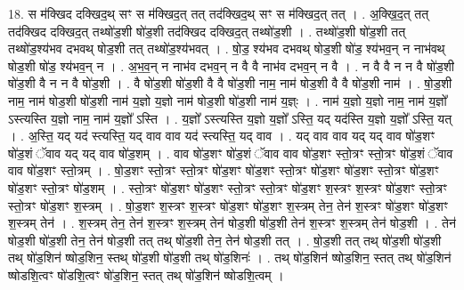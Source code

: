 \documentclass[17pt]{extarticle}
\begin{document}
18. स म॑क्खिद दक्खिद॒थ् सꣳ स म॑क्खिद॒त् तत् तद॑क्खिद॒थ् सꣳ स म॑क्खिद॒त् तत् । . अ॒क्खि॒द॒त् तत् तद॑क्खिद दक्खिद॒त् तथ्षो॑ड॒शी षो॑ड॒शी तद॑क्खिद दक्खिद॒त् तथ्षो॑ड॒शी । . तथ्षो॑ड॒शी षो॑ड॒शी तत् तथ्षो॑ड॒श्य॑भव दभवथ् षोड॒शी तत् तथ्षो॑ड॒श्य॑भवत् । . षो॒ड॒ श्य॑भव दभवथ् षोड॒शी षो॑ड॒ श्य॑भव॒न् न नाभ॑वथ् षोड॒शी षो॑ड॒ श्य॑भव॒न् न । . अ॒भ॒व॒न् न नाभ॑व दभव॒न् न वै वै नाभ॑व दभव॒न् न वै । . न वै वै न न वै षो॑ड॒शी षो॑ड॒शी वै न न वै षो॑ड॒शी । . वै षो॑ड॒शी षो॑ड॒शी वै वै षो॑ड॒शी नाम॒ नाम॑ षोड॒शी वै वै षो॑ड॒शी नाम॑ । . षो॒ड॒शी नाम॒ नाम॑ षोड॒शी षो॑ड॒शी नाम॑ य॒ज्ञो य॒ज्ञो नाम॑ षोड॒शी षो॑ड॒शी नाम॑ य॒ज्ञ्ः । . नाम॑ य॒ज्ञो य॒ज्ञो नाम॒ नाम॑ य॒ज्ञो᳚ ऽस्त्यस्ति य॒ज्ञो नाम॒ नाम॑ य॒ज्ञो᳚ ऽस्ति । . य॒ज्ञो᳚ ऽस्त्यस्ति य॒ज्ञो य॒ज्ञो᳚ ऽस्ति॒ यद् यद॑स्ति य॒ज्ञो य॒ज्ञो᳚ ऽस्ति॒ यत् । . अ॒स्ति॒ यद् यद॑ स्त्यस्ति॒ यद् वाव वाव यद॑ स्त्यस्ति॒ यद् वाव । . यद् वाव वाव यद् यद् वाव षो॑ड॒शꣳ षो॑ड॒शं ॅवाव यद् यद् वाव षो॑ड॒शम् । . वाव षो॑ड॒शꣳ षो॑ड॒शं ॅवाव वाव षो॑ड॒शꣳ स्तो॒त्रꣳ स्तो॒त्रꣳ षो॑ड॒शं ॅवाव वाव षो॑ड॒शꣳ स्तो॒त्रम् । . षो॒ड॒शꣳ स्तो॒त्रꣳ स्तो॒त्रꣳ षो॑ड॒शꣳ षो॑ड॒शꣳ स्तो॒त्रꣳ षो॑ड॒शꣳ षो॑ड॒शꣳ स्तो॒त्रꣳ षो॑ड॒शꣳ षो॑ड॒शꣳ स्तो॒त्रꣳ षो॑ड॒शम् । . स्तो॒त्रꣳ षो॑ड॒शꣳ षो॑ड॒शꣳ स्तो॒त्रꣳ स्तो॒त्रꣳ षो॑ड॒शꣳ श॒स्त्रꣳ श॒स्त्रꣳ षो॑ड॒शꣳ स्तो॒त्रꣳ स्तो॒त्रꣳ षो॑ड॒शꣳ श॒स्त्रम् । . षो॒ड॒शꣳ श॒स्त्रꣳ श॒स्त्रꣳ षो॑ड॒शꣳ षो॑ड॒शꣳ श॒स्त्रम् तेन॒ तेन॑ श॒स्त्रꣳ षो॑ड॒शꣳ षो॑ड॒शꣳ श॒स्त्रम् तेन॑ । . श॒स्त्रम् तेन॒ तेन॑ श॒स्त्रꣳ श॒स्त्रम् तेन॑ षोड॒शी षो॑ड॒शी तेन॑ श॒स्त्रꣳ श॒स्त्रम् तेन॑ षोड॒शी । . तेन॑ षोड॒शी षो॑ड॒शी तेन॒ तेन॑ षोड॒शी तत् तथ् षो॑ड॒शी तेन॒ तेन॑ षोड॒शी तत् । . षो॒ड॒शी तत् तथ् षो॑ड॒शी षो॑ड॒शी तथ् षो॑ड॒शिन॑ ष्षोड॒शिन॒ स्तथ् षो॑ड॒शी षो॑ड॒शी तथ् षो॑ड॒शिनः॑ । . तथ् षो॑ड॒शिन॑ ष्षोड॒शिन॒ स्तत् तथ् षो॑ड॒शिन॑ ष्षोडशि॒त्वꣳ षो॑डशि॒त्वꣳ षो॑ड॒शिन॒ स्तत् तथ् षो॑ड॒शिन॑ ष्षोडशि॒त्वम् । \newline
\end{document}
